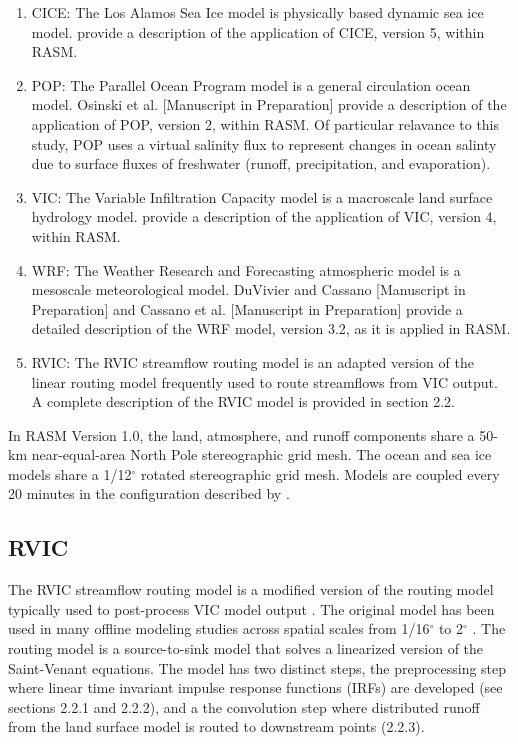 \documentclass[jgrga, draft]{agutex}
\begin{document}
\begin{article}
\begin{enumerate}
\item CICE: The Los Alamos Sea Ice model \citep{Hunke_2010} is physically based dynamic sea ice model.
\citet{Roberts_2015b} provide a description of the application of CICE, version 5, within RASM.
\item POP: The Parallel Ocean Program model \citep{Smith_2010} is a general circulation ocean model.
Osinski et al. [Manuscript in Preparation] provide a description of the application of POP, version 2, within RASM.
Of particular relavance to this study, POP uses a virtual salinity flux to represent changes in ocean salinty due to surface fluxes of freshwater (runoff, precipitation, and evaporation).
\item VIC: The Variable Infiltration Capacity model \citep{Liang_1996} is a macroscale land surface hydrology model.
\citet{Hamman_2015} provide a description of the application of VIC, version 4, within RASM.
\item WRF: The Weather Research and Forecasting atmospheric model \citep{Skamarock_2007} is a mesoscale meteorological model.
DuVivier and Cassano [Manuscript in Preparation] and Cassano et al. [Manuscript in Preparation] provide a detailed description of the WRF model, version 3.2, as it is applied in RASM.
\item RVIC: The RVIC streamflow routing model is an adapted version of the \citet{Lohmann_1996} linear routing model frequently used to route streamflows from VIC output.
A complete description of the RVIC model is provided in section 2.2.
\end{enumerate}

In RASM Version 1.0, the land, atmosphere, and runoff components share a 50-km near-equal-area North Pole stereographic grid mesh.
The ocean and sea ice models share a 1/12$^{\circ}$ rotated stereographic grid mesh.
Models are coupled every 20 minutes in the configuration described by \citet{Roberts_2015a}.

\subsection{RVIC}

The RVIC streamflow routing model is a modified version of the routing model typically used to post-process VIC model output \citep{Lohmann_1996, Lohmann_1998a}.
The original \citet{Lohmann_1996} model has been used in many offline modeling studies across spatial scales from 1/16$^{\circ}$ to 2$^{\circ}$ \citep[.e.g.][]{Nijssen_1997,Lohmann_1998b,Su_2005}.
The routing model is a source-to-sink model that solves a linearized version of the Saint-Venant equations.
The model has two distinct steps, the preprocessing step where linear time invariant impulse response functions (IRFs) are developed (see sections 2.2.1 and 2.2.2), and a the convolution step where distributed runoff from the land surface model is routed to downstream points (2.2.3).


\end{article}
\end{document}

